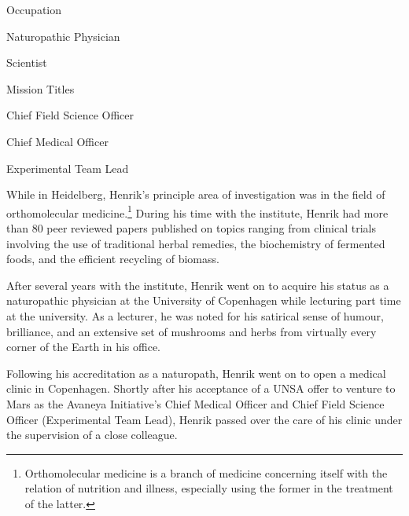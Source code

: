 {        \bTR
            \bTC Occupation \eTC
            \bTC 
                \startitemize[4]
                \startpacked
                \item Naturopathic Physician
                \item Scientist
                \stoppacked
                \stopitemize
            \eTC
        \eTR
        
        \bTR
            \bTC Mission Titles \eTC
            \bTC 
                \startitemize[4]
                \startpacked
                \item Chief Field Science Officer
                \item Chief Medical Officer
                \item Experimental Team Lead
                \stoppacked
                \stopitemize
            \eTC
        \eTR
    \eTABLEbody

\eTABLE
}

While in Heidelberg, Henrik's principle area of investigation was in the field of orthomolecular medicine.\footnote{Orthomolecular medicine is a branch of medicine concerning itself with the relation of nutrition and illness, especially using the former in the treatment of the latter.} During his time with the institute, Henrik had more than 80 peer reviewed papers published on topics ranging from clinical trials involving the use of traditional herbal remedies, the biochemistry of fermented foods, and the efficient recycling of biomass.

After several years with the institute, Henrik went on to acquire his status as a naturopathic physician at the University of Copenhagen while lecturing part time at the university. As a lecturer, he was noted for his satirical sense of humour, brilliance, and an extensive set of mushrooms and herbs from virtually every corner of the Earth in his office.

Following his accreditation as a naturopath, Henrik went on to open a medical clinic in Copenhagen. Shortly after his acceptance of a UNSA offer to venture to Mars as the Avaneya Initiative's Chief Medical Officer and Chief Field Science Officer (Experimental Team Lead), Henrik passed over the care of his clinic under the supervision of a close colleague.

